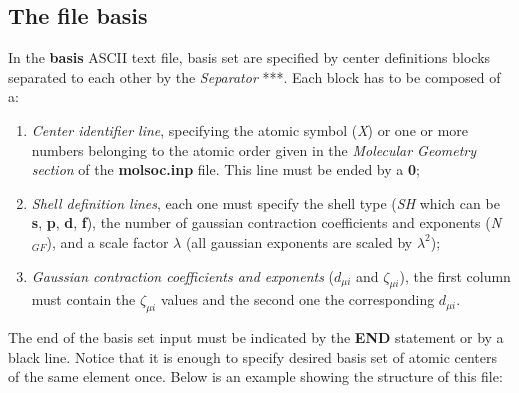 \documentclass[a4paper,12pt]{article}
\begin{document}
\subsection{The file {\bf basis}}
In the {\bf basis} ASCII text file, basis set are specified by 
center definitions blocks separated to each other by the {\em Separator} ***. Each 
block has to be composed of a:
\begin{enumerate}
 \item {\em Center identifier line}, specifying the atomic symbol 
({\em X}) or one or more numbers belonging to the atomic order given in the 
{\em Molecular Geometry section} of the {\bf molsoc.inp} file. This line must be ended by a {\bf 0};
\item {\em Shell definition lines}, each one must specify the shell type 
({\em SH} which can be {\bf s}, {\bf p}, {\bf d}, {\bf f}),
the number of gaussian contraction coefficients and exponents ({\em N$_{GF}$}), 
and a scale factor {$\lambda$} (all gaussian
exponents are scaled by $\lambda^2$);
\item {\em Gaussian contraction coefficients and exponents} ($d_{\mu i}$ and $\zeta_{\mu i}$),
 the first column must contain the $\zeta_{\mu i}$ values and the second one the corresponding $d_{\mu i}$.
\end{enumerate}
The end of the basis set input must be indicated by the {\bf END} statement or by a black line. 
Notice that it is enough to specify desired basis set of atomic centers of the same element once.
Below is an example showing the 
structure of this file: \\ \\
\end{document}
